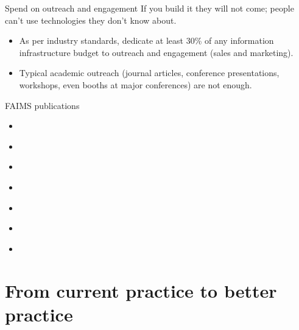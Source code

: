 \documentclass[aspectratio=169, 12pt]{beamer} %
\begin{document}
\begin{frame}{Spend on outreach and engagement}
  If you build it they will not come; people can't use technologies they don't know about.
      \begin{itemize}[label=\textbullet]
        \item As per industry standards, dedicate at least 30\% of any information infrastructure budget to outreach and engagement (sales and marketing). 
        \item Typical academic outreach (journal articles, conference presentations, workshops, even booths at major conferences) are not enough.
    \end{itemize}
\end{frame}

\begin{frame}{FAIMS publications}
      \begin{itemize}[label=\textbullet]
        \item \cite{Sobotkova2018-al}
        \item \cite{Ballsun-Stanton2018-zd}
        \item \cite{VanValkenburgh2018-hv}
        \item \cite{sobotkova2016-mx}
        \item \cite{Ross2015-ph} 
        \item \cite{Sobotkova2015-lq}
        \item \cite{Ross2013-hi}
    \end{itemize}
\end{frame}

\begin{multicols}{2}[]


\end{multicols}

\section{From current practice to better practice}
\end{document}
